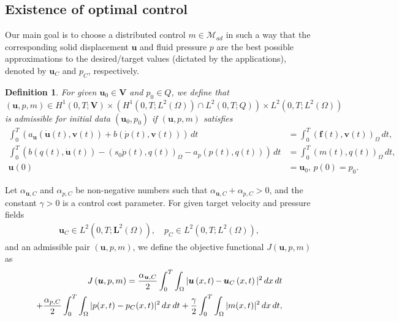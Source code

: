 \documentclass{amsart}
\newtheorem{definition}{Definition}[section]
\newcommand{\algn}[1]{\begin{align} #1 \end{align}}
\newcommand{\mc}[1]{\mathcal{#1}}
\newcommand{\LRp}[1]{\left( #1 \right)}
\begin{document}
\subsection{Existence of optimal control}\label{Existence of optimal control}
Our main goal is to choose a distributed control $m \in \mc{M}_{ad}$ in such a way that the corresponding solid displacement $\boldsymbol{u}$ and fluid pressure $p$ are the best possible approximations to the desired/target values (dictated by the applications), denoted by $\boldsymbol{u}_C$ and $p_C$, respectively.
\begin{definition} 
	For given $\boldsymbol{u}_0 \in \boldsymbol{V}$ and $p_0 \in Q$, we define that 
	$\LRp{\boldsymbol{u}, p, m}\in H^1(0,T;\boldsymbol{V}) \times (H^1(0,T;L^2(\Omega))\cap L^2(0,T;Q)) \times L^2(0,T;L^2(\Omega))$ is admissible  for initial data $(\boldsymbol{u}_0, p_0)$ if $\LRp{\boldsymbol{u}, p, m}$ satisfies
	\algn{
		\nonumber \int_0^T \LRp{a_{\boldsymbol{u}} \LRp{\dot{\boldsymbol{u}} (t), \boldsymbol{v} (t)} + b \LRp{\dot{p} (t), \boldsymbol{v} (t)}} \, dt &= \int_0^T \LRp{\boldsymbol{f} (t), \boldsymbol{v} (t)}_{\Omega} \, dt, \\
		\nonumber \int_0^T \LRp{b \LRp{q(t), \dot{\boldsymbol{u}} (t)} - \LRp{s_0 \dot{p} (t), q(t)}_{\Omega} - a_p\LRp{p(t), q(t)}} \, dt &= \int_0^T \LRp{m(t), q(t)}_{\Omega} \, dt, \\
		\nonumber \boldsymbol{u} (0) &= \boldsymbol{u}_0 \text{, } p(0) = p_0.
	}
\end{definition}
%
Let $\alpha_{\boldsymbol{u}, C}$ and $\alpha_{p, C}$ be non-negative numbers such that $ \alpha_{\boldsymbol{u}, C} +  \alpha_{p, C} > 0$, and the constant $\gamma > 0$ is a control cost parameter. For given target velocity and pressure fields 
%
\begin{align*}
    \boldsymbol{u}_C \in L^2(0,T; \boldsymbol{L}^2(\Omega)), \quad p_C \in L^2(0,T; L^2(\Omega)), %
\end{align*}
%
and an admissible pair $\LRp{\boldsymbol{u}, p, m}$, we define the objective functional $J \LRp{\boldsymbol{u}, p, m}$ as
\begin{align}
	\label{obj_fun} J \LRp{\boldsymbol{u}, p, m} = %
	  \frac{\alpha_{\boldsymbol{u}, C}}{2} \int_0^T \int_{\Omega} |\boldsymbol{u} \LRp{x, t} \hspace{-0.2mm}-\hspace{-0.2mm} \boldsymbol{u}_C \LRp{x, t}|^2 \, dx \, dt 
     \\
	 + \frac{\alpha_{p, C}}{2} \int_0^T \int_{\Omega} |p(x, t) - p_C (x, t)|^2 \, dx \, dt + \frac{\gamma}{2} \int_0^T \int_{\Omega} |m(x, t)|^2 \, dx \, dt \notag,
\end{align}
\end{document}
